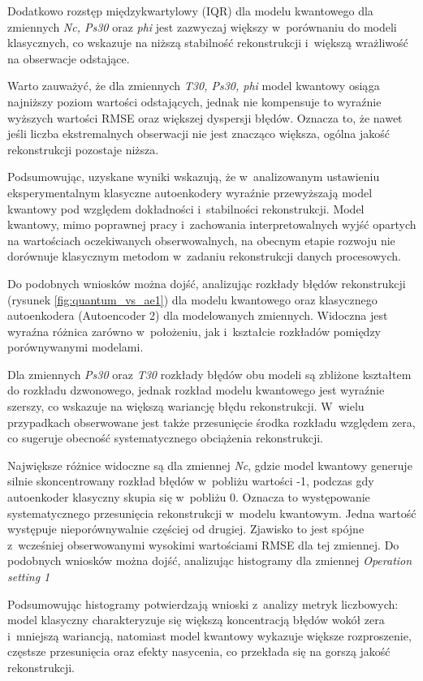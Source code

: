Dodatkowo rozstęp międzykwartylowy (IQR) dla modelu kwantowego dla zmiennych \textit{Nc, Ps30} oraz \textit{phi} jest zazwyczaj większy w~porównaniu do modeli klasycznych, co wskazuje na niższą stabilność rekonstrukcji i~większą wrażliwość na obserwacje odstające. 

Warto zauważyć, że dla zmiennych \textit{T30, Ps30, phi} model kwantowy osiąga najniższy poziom wartości odstających, jednak nie kompensuje to wyraźnie wyższych wartości RMSE oraz większej dyspersji błędów. Oznacza to, że nawet jeśli liczba ekstremalnych obserwacji nie jest znacząco większa, ogólna jakość rekonstrukcji pozostaje niższa.

Podsumowując, uzyskane wyniki wskazują, że w~analizowanym ustawieniu eksperymentalnym klasyczne autoenkodery wyraźnie przewyższają model kwantowy pod względem dokładności i~stabilności rekonstrukcji. Model kwantowy, mimo poprawnej pracy i~zachowania interpretowalnych wyjść opartych na wartościach oczekiwanych obserwowalnych, na obecnym etapie rozwoju nie dorównuje klasycznym metodom w~zadaniu rekonstrukcji danych procesowych.

Do podobnych wniosków można dojść, analizując rozkłady błędów rekonstrukcji (rysunek \ref{fig:quantum_vs_ae1}) dla modelu kwantowego oraz klasycznego autoenkodera (Autoencoder 2) dla modelowanych zmiennych. Widoczna jest wyraźna różnica zarówno w~położeniu, jak i~kształcie rozkładów pomiędzy porównywanymi modelami.

Dla zmiennych \textit{Ps30} oraz \textit{T30} rozkłady błędów obu modeli są zbliżone kształtem do rozkładu dzwonowego, jednak rozkład modelu kwantowego jest wyraźnie szerszy, co wskazuje na większą wariancję błędu rekonstrukcji. W~wielu przypadkach obserwowane jest także przesunięcie środka rozkładu względem zera, co sugeruje obecność systematycznego obciążenia rekonstrukcji.

Największe różnice widoczne są dla zmiennej \textit{Nc}, gdzie model kwantowy generuje silnie skoncentrowany rozkład błędów w~pobliżu wartości -1, podczas gdy autoenkoder klasyczny skupia się w~pobliżu 0. Oznacza to występowanie systematycznego przesunięcia rekonstrukcji w~modelu kwantowym. Jedna wartość występuje nieporównywalnie częściej od drugiej. Zjawisko to jest spójne z~wcześniej obserwowanymi wysokimi wartościami RMSE dla tej zmiennej. Do podobnych wniosków można dojść, analizując histogramy dla zmiennej \textit{Operation setting 1}

Podsumowując histogramy potwierdzają wnioski z~analizy metryk liczbowych:
model klasyczny charakteryzuje się większą koncentracją błędów wokół zera i~mniejszą wariancją, natomiast model kwantowy wykazuje większe rozproszenie, częstsze przesunięcia oraz efekty nasycenia, co przekłada się na gorszą jakość rekonstrukcji.

